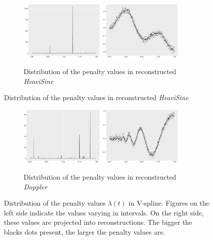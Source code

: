 \begin{figure}
\begin{subfigure}{\textwidth}
    \end{subfigure}
    \begin{subfigure}{\textwidth}
    \centering
    \includegraphics[width=0.45\textwidth]{Chapters/02TractorSplineTheory/plot/ggplot/ggHeaviSinePenaltyBar.pdf}
    \includegraphics[width=0.45\textwidth]{Chapters/02TractorSplineTheory/plot/ggplot/ggHeaviSinePenaltyLine.pdf}
    \caption{Distribution of the penalty values in reconstructed \textit{HeaviSine}}
    \end{subfigure}
\end{figure}
\begin{figure}\ContinuedFloat
    \centering 
    \begin{subfigure}{\textwidth}
    \centering
    \includegraphics[width=0.45\textwidth]{Chapters/02TractorSplineTheory/plot/ggplot/ggDopplerPenaltyBar.pdf}
    \includegraphics[width=0.45\textwidth]{Chapters/02TractorSplineTheory/plot/ggplot/ggDopplerPenaltyLine.pdf}
    \caption{Distribution of the penalty values in reconstructed \textit{Doppler}}
    \end{subfigure}
\caption{Distribution of the penalty values $\lambda(t)$ in V-spline. Figures on the left side indicate the values varying in intervals. On the right side, these values are projected into reconstructions. The bigger the blacks dots present, the larger the penalty values are.}\label{numpenalty}
\end{figure}


